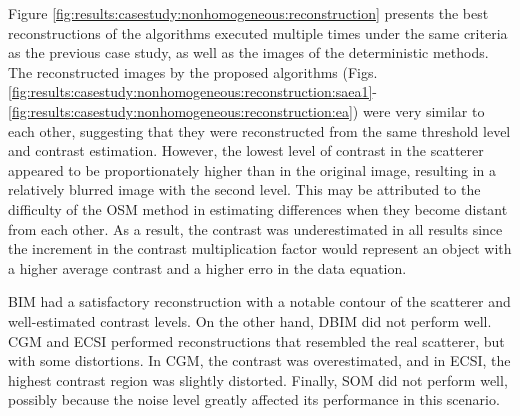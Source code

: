 			Figure \ref{fig:results:casestudy:nonhomogeneous:reconstruction} presents the best reconstructions of the algorithms executed multiple times under the same criteria as the previous case study, as well as the images of the deterministic methods. The reconstructed images by the proposed algorithms (Figs. \ref{fig:results:casestudy:nonhomogeneous:reconstruction:saea1}-\ref{fig:results:casestudy:nonhomogeneous:reconstruction:ea}) were very similar to each other, suggesting that they were reconstructed from the same threshold level and contrast estimation. However, the lowest level of contrast in the scatterer appeared to be proportionately higher than in the original image, resulting in a relatively blurred image with the second level. This may be attributed to the difficulty of the OSM method in estimating differences when they become distant from each other. As a result, the contrast was underestimated in all results since the increment in the contrast multiplication factor would represent an object with a higher average contrast and a higher erro in the data equation.
			
			BIM had a satisfactory reconstruction with a notable contour of the scatterer and well-estimated contrast levels. On the other hand, DBIM did not perform well. CGM and ECSI performed reconstructions that resembled the real scatterer, but with some distortions. In CGM, the contrast was overestimated, and in ECSI, the highest contrast region was slightly distorted. Finally, SOM did not perform well, possibly because the noise level greatly affected its performance in this scenario.
		
